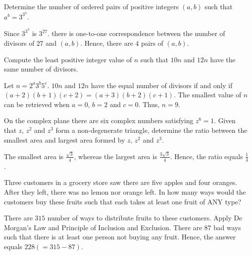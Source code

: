 \begin{problem}
Determine the number of ordered pairs of positive integers $(a,b)$ such that $a^b=3^{3^3}$.
\end{problem}

\begin{solution}
Since $3^{3^3}$ is $3^{27}$. there is one-to-one correspondence between the number of divisors of $27$ and $(a,b)$. Hence, there are $4$ pairs of $(a,b)$.
\end{solution}

\begin{problem}
Compute the least positive integer value of $n$ such that $10n$ and $12n$ have the same number of divisors.
\end{problem}

\begin{solution}
Let $n=2^a3^b5^c$. $10n$ and $12n$ have the equal number of divisors if and only if $(a+2)(b+1)(c+2)=(a+3)(b+2)(c+1)$. The smallest value of $n$ can be retrieved when $a=0$, $b=2$ and $c=0$. Thus, $n=9$.
\end{solution}

\begin{problem}
On the complex plane there are six complex numbers satisfying $z^6=1$. Given that $z$, $z^2$ and $z^3$ form a non-degenerate triangle, determine the ratio between the smallest area and largest area formed by $z$, $z^2$ and $z^3$.
\end{problem}

\begin{solution}
The smallest area is $\frac{\sqrt{3}}{4}$, whereas the largest area is $\frac{3\sqrt{3}}{4}$. Hence, the ratio equals $\frac{1}{3}$.
\end{solution}

\begin{problem}
Three customers in a grocery store saw there are five apples and four oranges. After they left, there was no lemon nor orange left. In how many ways would the customers buy these fruits such that each takes at least one fruit of ANY type?
\end{problem}

\begin{solution}
There are $315$ number of ways to distribute fruits to these customers. Apply De Morgan's Law and Principle of Inclusion and Exclusion. There are $87$ bad ways such that there is at least one person not buying any fruit. Hence, the answer equals $228(=315-87)$.
\end{solution}

